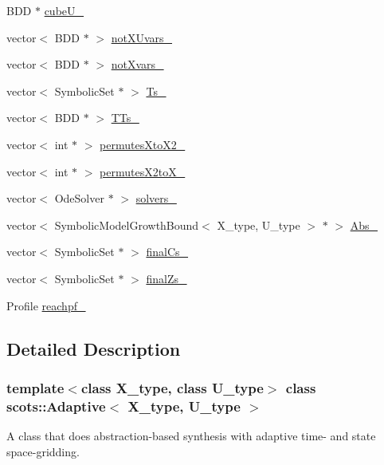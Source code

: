 \begin{DoxyCompactItemize}
B\+DD $\ast$ \hyperlink{classscots_1_1Adaptive_a0332230a9bad14d432e6651611863be9}{cube\+U\+\_\+}
\item 
vector$<$ B\+DD $\ast$ $>$ \hyperlink{classscots_1_1Adaptive_ac3f203003011bcea5176ef294ab7a8a0}{not\+X\+Uvars\+\_\+}
\item 
vector$<$ B\+DD $\ast$ $>$ \hyperlink{classscots_1_1Adaptive_a8fbbf6976e589506c9e4c38045196c07}{not\+Xvars\+\_\+}
\item 
vector$<$ Symbolic\+Set $\ast$ $>$ \hyperlink{classscots_1_1Adaptive_ab9f37fda9e698b797079d28b243f3a5b}{Ts\+\_\+}
\item 
vector$<$ B\+DD $\ast$ $>$ \hyperlink{classscots_1_1Adaptive_a1f4c02094ecd380887640c83fc1d0310}{T\+Ts\+\_\+}
\item 
vector$<$ int $\ast$ $>$ \hyperlink{classscots_1_1Adaptive_ae954d4d3177bdc4093530e254ace2b34}{permutes\+Xto\+X2\+\_\+}
\item 
vector$<$ int $\ast$ $>$ \hyperlink{classscots_1_1Adaptive_a88edb6662310c07120d07c9dff968ddc}{permutes\+X2to\+X\+\_\+}
\item 
vector$<$ Ode\+Solver $\ast$ $>$ \hyperlink{classscots_1_1Adaptive_a0b300511b5f746c7b24ead30dc0ca9ac}{solvers\+\_\+}
\item 
vector$<$ Symbolic\+Model\+Growth\+Bound$<$ X\+\_\+type, U\+\_\+type $>$ $\ast$ $>$ \hyperlink{classscots_1_1Adaptive_ab51fe5639ecc8fd046c1d2d56fb25890}{Abs\+\_\+}
\item 
vector$<$ Symbolic\+Set $\ast$ $>$ \hyperlink{classscots_1_1Adaptive_a5a70ee2d2b4efe4f5eb20d08a596ec7b}{final\+Cs\+\_\+}
\item 
vector$<$ Symbolic\+Set $\ast$ $>$ \hyperlink{classscots_1_1Adaptive_af22209ae22c8b2dd921be22cc51a36dd}{final\+Zs\+\_\+}
\item 
Profile \hyperlink{classscots_1_1Adaptive_a8c62c5ae1d50e3301098b864c5b2883f}{reachpf\+\_\+}
\end{DoxyCompactItemize}


\subsection{Detailed Description}
\subsubsection*{template$<$class X\+\_\+type, class U\+\_\+type$>$\newline
class scots\+::\+Adaptive$<$ X\+\_\+type, U\+\_\+type $>$}

A class that does abstraction-\/based synthesis with adaptive time-\/ and state space-\/gridding. 

